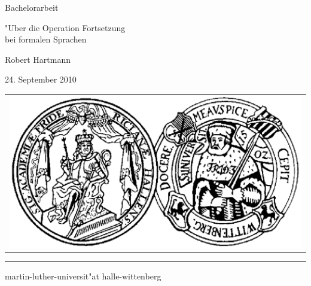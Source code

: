 \pagestyle{empty}

\begin{center}

{\Large\sc Bachelorarbeit}

\vspace{1.25cm}

{\fontsize{22}{22}\selectfont "Uber die Operation Fortsetzung\\bei formalen Sprachen}

\vspace{1.25cm}

{\Large\sc

Robert Hartmann

\vspace{.15cm}

24. September 2010

}

\vspace{10.5cm}

\begin{tabular}{c}
	\includegraphics[height=15ex]{Bilder/siegel}
\end{tabular}

\vspace{0.5cm}

\rule{.7\textwidth}{.40pt}

\vspace{.2cm}

{\large\sc

martin-luther-universit"at halle-wittenberg

}

\end{center}

\cleardoublepage

